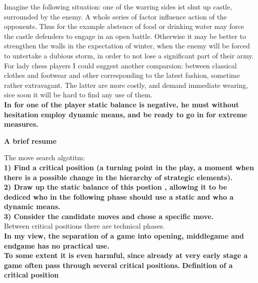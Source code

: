 \documentclass[10pt]{article}
\begin{document}
Imagine the following situation: one of the warring sides ist shut up
castle, surrounded by the enemy. A whole series of factor influence
action of the opponents. Thus for the example abstence of food or drinking
water may force the castle defenders to engage in an open battle. Otherwise
it may be better to strengthen the walls in the expectation of winter, when
the enemy will be forced to untertake a dubious storm, in order to not lose
a significant part of their army.\\

For lady chess players I could suggest another comparsion: between classical
clothes and footwear and other corresponding to the latest fashion, sometime
rather extravagant. The latter are more costly, and demand immediate wearing,
sice soon it will be hard to find any use of them.\\

\textbf{In for one of the player static balance is negative, he must without
hesitation employ dynamic means, and be ready to go in for extreme measures.}\\

\begin{center}
    \textbf{\Large A brief resume}
\end{center}
The move search algotitm:\\

\textbf{1) Find a critical position (a turning point in the play, a moment when
there is a possible change in the hierarchy of strategic elements).}\\

\textbf{2) Draw up the static balance of this postion , allowing it to be dediced
who in the following phase should use a static and who a dynamic means.}\\

\textbf{3) Consider the candidate moves and chose a specific move.}\\

Between critical positions there are technical phases.\\

\textbf{In my view, the separation of a game into opening, middlegame and endgame
has no practical use.}\\

\textbf{To some extent it is even harmful, since already at very early stage a game
often pass through several critical positions.}
\newpage
\textbf{\Large Definition of a critical position}\\
\end{document}
